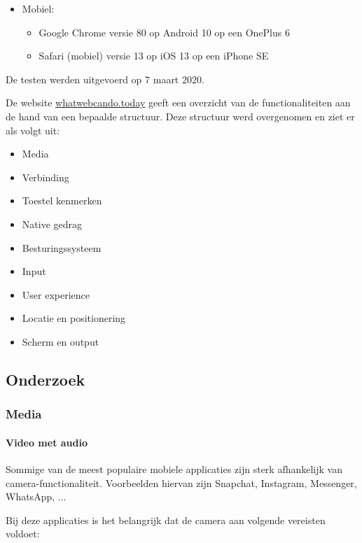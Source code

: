 	
	\begin{itemize}
	   \item Mobiel:
	   \begin{itemize}
	     \item Google Chrome versie 80 op Android 10 op een OnePlus 6
	     \item Safari (mobiel) versie 13 op iOS 13 op een iPhone SE 
	     
	   \end{itemize}
	\end{itemize}
	
	De testen werden uitgevoerd op 7 maart 2020.
	
	De website \href{https://whatwebcando.today/}{whatwebcando.today} geeft een overzicht van de functionaliteiten aan de hand van een bepaalde structuur. Deze structuur werd overgenomen en ziet er als volgt uit:
	   \begin{itemize}
	     \item	Media
	     \item	Verbinding
	     \item	Toestel kenmerken
	     \item	Native gedrag
	     \item	Besturingssysteem
	     \item	Input
	     \item	User experience
	     \item	Locatie en positionering
	     \item	Scherm en output
	   \end{itemize}
	
	\subsection{Onderzoek}
	
	\subsubsection{Media}
	
	\paragraph{Video met audio }
	
	Sommige van de meest populaire mobiele applicaties zijn sterk afhankelijk van camera-functionaliteit. Voorbeelden hiervan zijn Snapchat, Instagram, Messenger, WhatsApp, ...
	
	Bij deze applicaties is het belangrijk dat de camera aan volgende vereisten voldoet:
	
